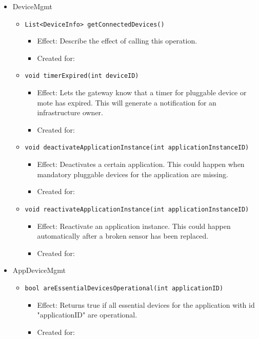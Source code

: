 \begin{itemize}
            \item DeviceMgmt
            \begin{itemize}
                \item \texttt{List<DeviceInfo> getConnectedDevices()}
                \begin{itemize}
                    \item Effect: Describe the effect of calling this operation.
                    \item Created for:
                \end{itemize}
                \item \texttt{void timerExpired(int deviceID)}
                \begin{itemize}
                    \item Effect: Lets the gateway know that a timer for pluggable device or mote has expired.
                                  This will generate a notification for an infrastructure owner.
                    \item Created for:
                \end{itemize}
                \item \texttt{void deactivateApplicationInstance(int applicationInstanceID)}
                \begin{itemize}
                    \item Effect: Deactivates a certain application. This could happen when
                                  mandatory pluggable devices for the application are missing.
                    \item Created for:
                \end{itemize}
                \item \texttt{void reactivateApplicationInstance(int applicationInstanceID)}
                \begin{itemize}
                    \item Effect: Reactivate an application instance. This could happen
                                  automatically after a broken sensor has been replaced.
                    \item Created for:
                \end{itemize}
            \end{itemize}

            \item AppDeviceMgmt
            \begin{itemize}
                \item \texttt{bool areEssentialDevicesOperational(int applicationID)}
                \begin{itemize}
                    \item Effect: Returns true if all essential devices for the application
                                  with id "applicationID" are operational.
                    \item Created for:
                \end{itemize}
            \end{itemize}
        \end{itemize}

